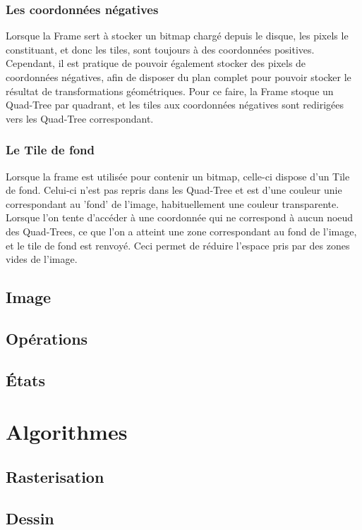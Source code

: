 			\subsubsection{Les coordonnées négatives}
				Lorsque la Frame sert à stocker un bitmap chargé depuis le disque, les pixels le constituant, et donc les tiles, sont toujours
				à des coordonnées positives. Cependant, il est pratique de pouvoir également stocker des pixels de coordonnées négatives, afin
				de disposer du plan complet pour pouvoir stocker le résultat de transformations géométriques. Pour ce faire, la Frame
				stoque un Quad-Tree par quadrant, et les tiles aux coordonnées négatives sont redirigées vers les Quad-Tree correspondant.

			\subsubsection{Le Tile de fond}
				Lorsque la frame est utilisée pour contenir un bitmap, celle-ci dispose d'un Tile de fond. Celui-ci n'est pas repris
				dans les Quad-Tree et est d'une couleur unie correspondant au 'fond' de l'image, habituellement une couleur transparente.
				Lorsque l'on tente d'accéder à une coordonnée qui ne correspond à aucun noeud des Quad-Trees, ce que l'on a atteint une zone
				correspondant au fond de l'image, et le tile de fond est renvoyé. Ceci permet de réduire l'espace pris par des zones vides
				de l'image.

		\subsection{Image}
		\subsection{Opérations}
		\subsection{États}
	\section{Algorithmes}
		\subsection{Rasterisation}
		\subsection{Dessin}

